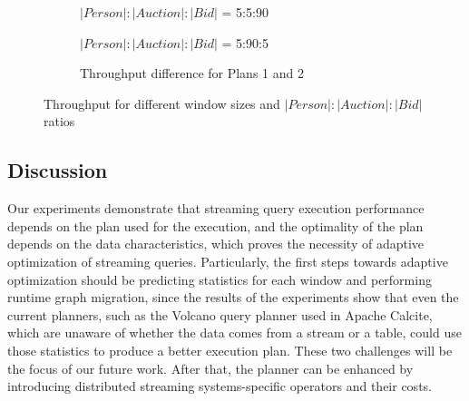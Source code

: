 \begin{figure*}[t!]
    \begin{subfigure}[b]{0.32\textwidth}
            
            \captionsetup{justification=justified}
            \caption{$|Person|:|Auction|:|Bid|$ = 5:5:90}
            \label{fig:throughput_window_5590}
    \end{subfigure}
    \hspace{2mm}
    \begin{subfigure}[b]{0.32\textwidth}
            
            \captionsetup{justification=justified}
            \caption{$|Person|:|Auction|:|Bid|$ = 5:90:5}
            \label{fig:throughput_window_5905}
    \end{subfigure}
    \hspace{2mm}
    \begin{subfigure}[b]{0.32\textwidth}
            
            \captionsetup{justification=justified}
            \caption{Throughput difference for Plans 1 and 2}
            \label{fig:throughput_diff_against_window_size}
    \end{subfigure}
    \caption{Throughput for different window sizes and $|Person|:|Auction|:|Bid|$ ratios}
    \label{fig:throughput_plots}
\end{figure*}


\subsection{Discussion}

Our experiments demonstrate that streaming query execution performance depends on the plan used for the execution, and the optimality of the plan depends on the data characteristics, which proves the necessity of adaptive optimization of streaming queries. Particularly, the first steps towards adaptive optimization should be predicting statistics for each window and performing runtime graph migration, since the results of the experiments show that even the current planners, such as the Volcano query planner \cite{graefe1993volcano} used in Apache Calcite, which are unaware of whether the data comes from a stream or a table, could use those statistics to produce a better execution plan. These two challenges will be the focus of our future work. After that, the planner can be enhanced by introducing distributed streaming systems-specific operators and their costs.



